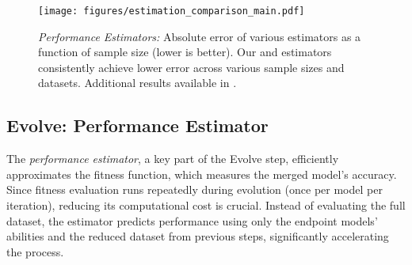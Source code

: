 \begin{figure*}
    \centering
    \texttt{[image: figures/estimation\_comparison\_main.pdf]}
    \caption{\textit{Performance Estimators:} Absolute error of various estimators as a function of sample size (lower is better). Our \mpirt{} and \gmpirt{} estimators consistently achieve lower error across various sample sizes and datasets.
     Additional results available in .}
    \label{fig:estimation_comparison}
\end{figure*}

\subsection{Evolve: Performance Estimator}
\label{sec:evolve}
The \textit{performance estimator}, a key part of the Evolve step, efficiently approximates the fitness function, which measures the merged model's accuracy. Since fitness evaluation runs repeatedly during evolution (once per model per iteration), reducing its computational cost is crucial. Instead of evaluating the full dataset, the estimator predicts performance using only the endpoint models' abilities and the reduced dataset from previous steps, significantly accelerating the process.

